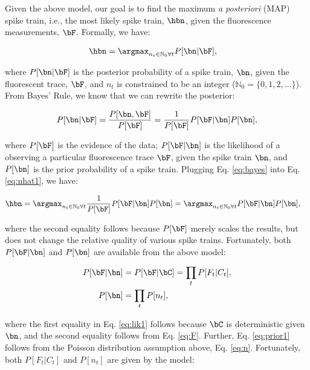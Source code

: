 Given the above model, our goal is to find the maximum \emph{a posteriori} (MAP) spike train, i.e., the most likely spike train, $\hbn$,  given the fluorescence measurements, $\bF$. Formally, we have:

\begin{align} \label{eq:nhat1} 
\hbn &=  \anx P[\bn | \bF], 
\end{align}

\noindent where $P[\bn | \bF]$ is the posterior probability of a spike train, $\bn$, given the fluorescent trace, $\bF$, and $n_t$ is constrained to be an integer ($\mathbb{N}_0=\{0,1,2,\ldots\}$).  From Bayes' Rule, we know that we can rewrite the posterior:

\begin{align} \label{eq:bayes}
P[\bn | \bF] = \frac{P[\bn, \bF]}{P[\bF]} = \frac{1}{P[\bF]} P[\bF | \bn] P[\bn],
\end{align}

\noindent where $P[\bF]$ is the evidence of the data; $P[\bF | \bn]$ is the likelihood of a observing a particular fluorescence trace $\bF$, given the spike train $\bn$, and $P[\bn]$ is the prior probability of a spike train.  Plugging Eq. \eqref{eq:bayes} into Eq. \eqref{eq:nhat1}, we have:

\begin{align} \label{eq:nhat2} 
\hbn &=  \anx \frac{1}{P[\bF]} P[\bF | \bn] P[\bn] =  \anx  P[\bF | \bn] P[\bn],
\end{align}

\noindent where the second equality follows because $P[\bF]$ merely scales the results, but does not change the relative quality of various spike trains.  Fortunately, both $P[\bF | \bn]$ and $P[\bn]$ are available from the above model:

\begin{subequations} \label{eq:post1}
\begin{align}
P[\bF | \bn]&= P[\bF | \bC] 	= \prod_t P[F_t | C_t], \label{eq:lik1} \\ 
P[\bn] 		&= \prod_t P[n_t], \label{eq:prior1}
\end{align}
\end{subequations}

\noindent where the first equality in Eq. \eqref{eq:lik1} follows because $\bC$ is deterministic given $\bn$, and the second equality follows from Eq. \eqref{eq:F}. Further, Eq. \eqref{eq:prior1} follows from the Poisson distribution assumption above, Eq. \eqref{eq:n}.  Fortunately, both $P[F_t | C_t]$ and $P[n_t]$ are given by the model:

